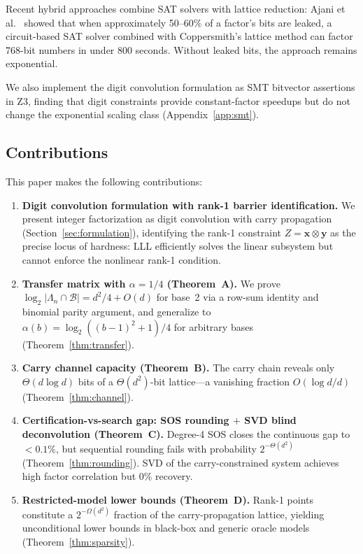 \documentclass[11pt,a4paper]{article}
\begin{document}
Recent hybrid approaches combine SAT solvers with lattice reduction: Ajani et al.~\cite{ajani24} showed that when approximately 50--60\% of a factor's bits are leaked, a circuit-based SAT solver combined with Coppersmith's lattice method can factor 768-bit numbers in under 800 seconds. Without leaked bits, the approach remains exponential.

We also implement the digit convolution formulation as SMT bitvector assertions in Z3, finding that digit constraints provide constant-factor speedups but do not change the exponential scaling class (Appendix~\ref{app:smt}).

\subsection{Contributions}

This paper makes the following contributions:

\begin{enumerate}[leftmargin=*]
\item \textbf{Digit convolution formulation with rank-1 barrier identification.} We present integer factorization as digit convolution with carry propagation (Section~\ref{sec:formulation}), identifying the rank-1 constraint $Z = \mathbf{x}\otimes\mathbf{y}$ as the precise locus of hardness: LLL efficiently solves the linear subsystem but cannot enforce the nonlinear rank-1 condition.

\item \textbf{Transfer matrix with $\alpha = 1/4$ (Theorem~A).} We prove $\log_2|\Lambda_n \cap \mathcal{B}| = d^2/4 + O(d)$ for base~2 via a row-sum identity and binomial parity argument, and generalize to $\alpha(b) = \log_2((b{-}1)^2+1)/4$ for arbitrary bases (Theorem~\ref{thm:transfer}).

\item \textbf{Carry channel capacity (Theorem~B).} The carry chain reveals only $\Theta(d\log d)$ bits of a $\Theta(d^2)$-bit lattice---a vanishing fraction $O(\log d/d)$ (Theorem~\ref{thm:channel}).

\item \textbf{Certification-vs-search gap: SOS rounding $+$ SVD blind deconvolution (Theorem~C).} Degree-4 SOS closes the continuous gap to $<0.1\%$, but sequential rounding fails with probability $2^{-\Theta(d^2)}$ (Theorem~\ref{thm:rounding}).  SVD of the carry-constrained system achieves high factor correlation but $0\%$ recovery.

\item \textbf{Restricted-model lower bounds (Theorem~D).} Rank-1 points constitute a $2^{-\Omega(d^2)}$ fraction of the carry-propagation lattice, yielding unconditional lower bounds in black-box and generic oracle models (Theorem~\ref{thm:sparsity}).
\end{enumerate}
\end{document}
